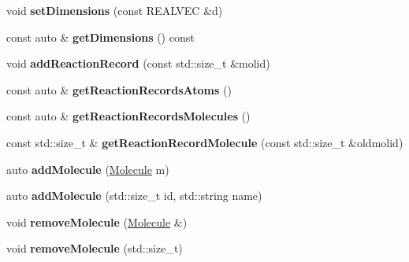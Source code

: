 \begin{DoxyCompactItemize}
\item 
\mbox{\label{classTopology_a43e08a71c5c230a3b80a2254bb7590dd}} 
void {\bfseries set\+Dimensions} (const R\+E\+A\+L\+V\+EC \&d)
\item 
\mbox{\label{classTopology_a00fe36f612b0f115f0c8021b846c4bf6}} 
const auto \& {\bfseries get\+Dimensions} () const
\item 
\mbox{\label{classTopology_ae63fd2235cbe695a3d8fd447efba931d}} 
void {\bfseries add\+Reaction\+Record} (const std\+::size\+\_\+t \&molid)
\item 
\mbox{\label{classTopology_a7bb2878be1add1b4b27750966d561eae}} 
const auto \& {\bfseries get\+Reaction\+Records\+Atoms} ()
\item 
\mbox{\label{classTopology_a257fce4a1dd8785861a001fca1847d4e}} 
const auto \& {\bfseries get\+Reaction\+Records\+Molecules} ()
\item 
\mbox{\label{classTopology_a4bca05cee9589ad00b18d92c67646bea}} 
const std\+::size\+\_\+t \& {\bfseries get\+Reaction\+Record\+Molecule} (const std\+::size\+\_\+t \&oldmolid)
\item 
\mbox{\label{classTopology_a5a99967e344fd10de5c61bc4839f4681}} 
auto {\bfseries add\+Molecule} (\mbox{\hyperlink{classMolecule}{Molecule}} m)
\item 
\mbox{\label{classTopology_a13905ac1030de2330788a80b3ba10adc}} 
auto {\bfseries add\+Molecule} (std\+::size\+\_\+t id, std\+::string name)
\item 
\mbox{\label{classTopology_adf853f3c5e1faaa520945fa4d8636cb7}} 
void {\bfseries remove\+Molecule} (\mbox{\hyperlink{classMolecule}{Molecule}} \&)
\item 
\mbox{\label{classTopology_a43bde0718e4d50ccfd96ef7d55ee9511}} 
void {\bfseries remove\+Molecule} (std\+::size\+\_\+t)
\item 
\mbox{\label{classTopology_ae75e30fd331e67182af3de9f7561260a}} 

\end{DoxyCompactItemize}
